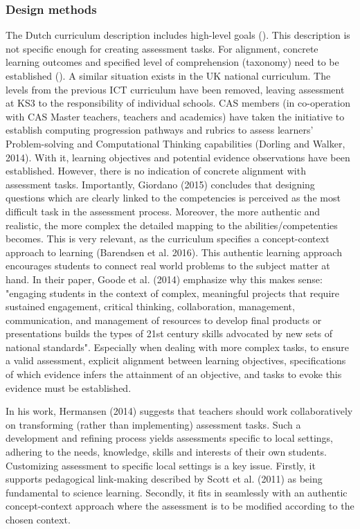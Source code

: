 \subsubsection*{Design methods}
The Dutch curriculum description includes high-level goals (\cite{Barendsen2016}). This description is not specific enough for creating assessment tasks. For alignment, concrete learning outcomes and specified level of comprehension (taxonomy) need to be established (\cite{biggs1996}). A similar situation exists in the UK national curriculum. The levels from the previous ICT curriculum have been removed, leaving assessment at KS3 to the responsibility of individual schools. CAS members (in co-operation with CAS Master teachers, teachers and academics) have taken the initiative to establish computing progression pathways and rubrics to assess learners' Problem-solving and Computational Thinking capabilities (Dorling and Walker, 2014). With it, learning objectives and potential evidence observations have been established. However, there is no indication of concrete alignment with assessment tasks. Importantly, Giordano (2015) concludes that designing questions which are clearly linked to the competencies is perceived as the most difficult task in the assessment process. Moreover, the more authentic and realistic, the more complex the detailed mapping to the abilities/competenties becomes. This is very relevant, as the curriculum specifies a concept-context approach to learning (Barendsen et al. 2016). This authentic learning approach encourages students to connect real world problems to the subject matter at hand. In their paper, Goode et al. (2014) emphasize why this makes sense: "engaging students in the context of complex, meaningful projects that require sustained engagement, critical thinking, collaboration, management, communication, and management of resources to develop final products or presentations builds the types of 21st century skills advocated by new sets of national standards". Especially when dealing with more complex tasks, to ensure a valid assessment, explicit alignment between learning objectives, specifications of which evidence infers the attainment of an objective, and tasks to evoke this evidence must be established.


In his work, Hermansen (2014) suggests that teachers should work collaboratively on transforming (rather than implementing) assessment tasks. Such a development and refining process yields assessments specific to local settings, adhering to the needs, knowledge, skills and interests of their own students. Customizing assessment to specific local settings is a key issue. Firstly, it supports pedagogical link-making described by Scott et al. (2011) as being fundamental to science learning. Secondly, it fits in seamlessly with an authentic concept-context approach where the assessment is to be modified according to the chosen context.


